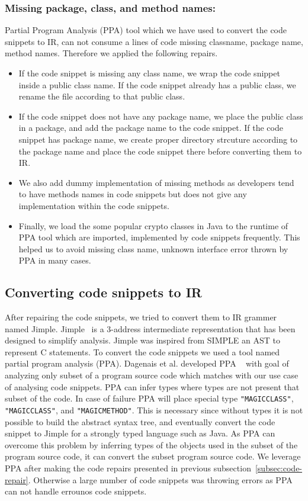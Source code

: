 \subsubsection{Missing package, class, and method names:}
Partial Program Analysis (PPA) tool which we have used to convert the code snippets to IR, can not consume a lines  of code missing classname, package name, method names. Therefore we applied the following repairs. 
\begin{itemize}
\item If the code snippet is missing any class name, we wrap the code snippet inside a public class name. If the code snippet already has a public class, we rename the file according to that public class.
\item If the code snippet does not have any package name, we place the public class in a package, and add the package name to the code snippet. If the code snippet has package name, we create proper directory strcuture according to the package name and place the code snippet there before converting them to IR. 
\item We also add dummy implementation of missing methods as developers tend to have methods names  in code snippets but does not give any implementation within the code snippets.
\item Finally, we load the some popular crypto classes in Java to the runtime of PPA tool which are imported, implemented by code snippets frequently. This helped us to avoid missing class name, unknown interface error thrown by PPA in many cases.  
 
\end{itemize}
       
\subsection{Converting code snippets to IR}
\label{subsec:converting-to-IR}

After repairing the code snippets, we tried to convert them to IR grammer named Jimple. Jimple~\cite{vallee1998jimple} is a 3-address intermediate representation that has been designed to simplify analysis. Jimple was inspired from SIMPLE an AST to represent C statements. To convert the code snippets we used a tool named partial program analysis (PPA). Dagenais et al. developed PPA ~\cite{dagenais2008enabling} with goal of analyzing only subset of a program source code which matches with our use case of analysing code snippets. PPA  can infer types where types are not present that subset of the code. In case of failure PPA will place special type \texttt{"MAGICCLASS"}, \texttt{"MAGICCLASS"}, and \texttt{"MAGICMETHOD"}. This is necessary since without types it is not possible to build the abstract syntax tree, and eventually convert the code snippet to Jimple for a strongly typed language such as Java. As PPA can overcome this problem by inferring types of the objects used in the subset of the program source code, it can convert the subset program source code. We leverage PPA after making the code repairs presented in previous subsection~\ref{subsec:code-repair}. Otherwise a large number of code snippets was throwing errors as PPA can not handle errounos code snippets.     

